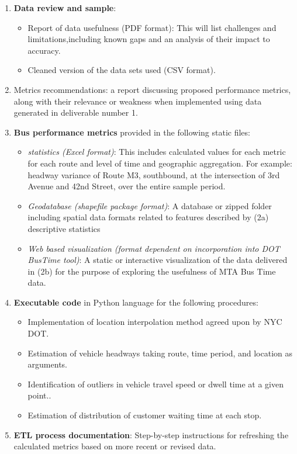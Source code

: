\documentclass[12pt]{report}
\begin{document}
\begin{enumerate}
\item \textbf{Data review and sample}:

\begin{itemize}
\item Report of data usefulness (PDF format): This will list challenges and limitations,including known gaps and an analysis of their impact to accuracy.
\item Cleaned version of the data sets used (CSV format).

\end{itemize}

\item Metrics recommendations: a report discussing proposed performance metrics, along with their relevance or weakness when implemented using data generated in deliverable number 1. 

\item \textbf{Bus performance metrics} provided in the following static files:

\begin{itemize}
\item \textit{statistics (Excel format)}: This includes calculated values for each metric for each route and level of time and geographic aggregation.  For example: headway variance of Route M3, southbound, at the intersection of 3rd Avenue and 42nd Street, over the entire sample period.
\item \textit{Geodatabase (shapefile package format)}: A database or zipped folder including spatial data formats related to features described by (2a) descriptive statistics
\item \textit{Web based visualization (format dependent on incorporation into DOT BusTime tool)}: A static or interactive visualization of the data delivered in (2b) for the purpose of exploring the usefulness of MTA Bus Time data.


\end{itemize}

\item \textbf{Executable code} in Python language for the following procedures:

\begin{itemize}
\item Implementation of location interpolation method agreed upon by NYC DOT.
\item Estimation of vehicle headways taking route, time period, and location as arguments.
\item Identification of outliers in vehicle travel speed or dwell time at a given point..
\item Estimation of distribution of customer waiting time at each stop.

\end{itemize}

\item \textbf{ETL process documentation}: Step-by-step instructions for refreshing the calculated metrics based on more recent or revised data.
\end{enumerate}
\end{document}
